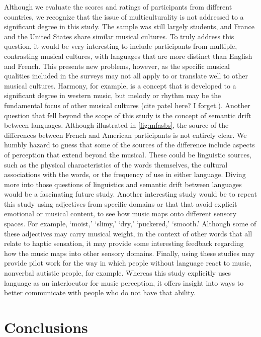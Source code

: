 \documentclass[
  english,
  man,floatsintext]{apa6}
\begin{document}
Although we evaluate the scores and ratings of participants from different countries, we recognize that the issue of multiculturality is not addressed to a significant degree in this study. The sample was still largely students, and France and the United States share similar musical cultures. To truly address this question, it would be very interesting to include participants from multiple, contrasting musical cultures, with languages that are more distinct than English and French. This presents new problems, however, as the specific musical qualities included in the surveys may not all apply to or translate well to other musical cultures. Harmony, for example, is a concept that is developed to a significant degree in western music, but melody or rhythm may be the fundamental focus of other musical cultures (cite patel here? I forget.).
Another question that fell beyond the scope of this study is the concept of semantic drift between languages. Although illustrated in \ref{fig:mfasbs}, the source of the differences between French and American participants is not entirely clear. We humbly hazard to guess that some of the sources of the difference include aspects of perception that extend beyond the musical. These could be linguistic sources, such as the physical characteristics of the words themselves, the cultural associations with the words, or the frequency of use in either language. Diving more into those questions of linguistics and semantic drift between languages would be a fascinating future study.
Another interesting study would be to repeat this study using adjectives from specific domains or that that avoid explicit emotional or musical content, to see how music maps onto different sensory spaces. For example, `moist,' `slimy,' `dry,' `puckered,' `smooth.' Although some of these adjectives may carry musical weight, in the context of other words that all relate to haptic sensation, it may provide some interesting feedback regarding how the music maps into other sensory domains.
Finally, using these studies may provide pilot work for the way in which people without language react to music, nonverbal autistic people, for example. Whereas this study explicitly uses language as an interlocutor for music perception, it offers insight into ways to better communicate with people who do not have that ability.

\hypertarget{conclusions}{%
\section{Conclusions}\label{conclusions}}
\end{document}
